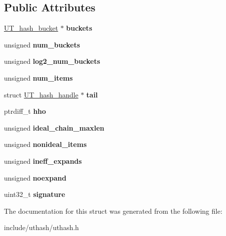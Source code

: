 \subsection*{Public Attributes}
\begin{DoxyCompactItemize}
\item 
\mbox{\label{struct_u_t__hash__table_a04556bbef9c9a1c40b1bc0d17a2a6e0b}} 
\mbox{\hyperlink{struct_u_t__hash__bucket}{U\+T\+\_\+hash\+\_\+bucket}} $\ast$ {\bfseries buckets}
\item 
\mbox{\label{struct_u_t__hash__table_a3ed04b6233facaedf910672578d86339}} 
unsigned {\bfseries num\+\_\+buckets}
\item 
\mbox{\label{struct_u_t__hash__table_ae376a7f3fac525f3a9d03b6beec8d12f}} 
unsigned {\bfseries log2\+\_\+num\+\_\+buckets}
\item 
\mbox{\label{struct_u_t__hash__table_a74534cc14f080c96f94d8f5da83d9d76}} 
unsigned {\bfseries num\+\_\+items}
\item 
\mbox{\label{struct_u_t__hash__table_a00a889a5e1ebaeec0a83ec2701df1992}} 
struct \mbox{\hyperlink{struct_u_t__hash__handle}{U\+T\+\_\+hash\+\_\+handle}} $\ast$ {\bfseries tail}
\item 
\mbox{\label{struct_u_t__hash__table_afd05f4d9e45354fb010367ae9e1bddb6}} 
ptrdiff\+\_\+t {\bfseries hho}
\item 
\mbox{\label{struct_u_t__hash__table_a5f1cec93d5d753ba02097c797e4d67ad}} 
unsigned {\bfseries ideal\+\_\+chain\+\_\+maxlen}
\item 
\mbox{\label{struct_u_t__hash__table_a8cb66cfb259a204cda59a815e4db664f}} 
unsigned {\bfseries nonideal\+\_\+items}
\item 
\mbox{\label{struct_u_t__hash__table_a216c7d98cf40a0064bee94aa8a5bf1b7}} 
unsigned {\bfseries ineff\+\_\+expands}
\item 
\mbox{\label{struct_u_t__hash__table_a635661789933752e7b83dac84430eae1}} 
unsigned {\bfseries noexpand}
\item 
\mbox{\label{struct_u_t__hash__table_a87d1ab3f3ede1809c6a485972d20b25f}} 
uint32\+\_\+t {\bfseries signature}
\end{DoxyCompactItemize}


The documentation for this struct was generated from the following file\+:\begin{DoxyCompactItemize}
\item 
include/uthash/uthash.\+h\end{DoxyCompactItemize}
